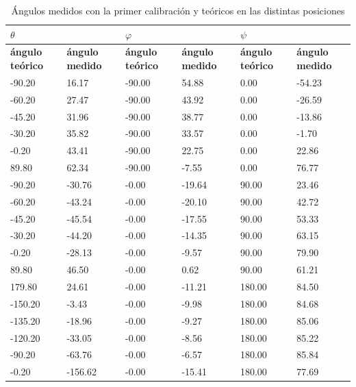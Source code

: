 \documentclass[main]{subfiles}
\begin{document}
\begin{table}
\begin{tabular}{|p{50pt}|p{50pt}|p{50pt}|p{51pt}|p{50pt}|p{50pt}|}
\hline
  
\multicolumn{2}{|p{113pt}|}{\cellcolor[gray]{0.6} $\theta$}  
& \multicolumn{2}{|p{114pt}|}{\cellcolor[gray]{0.6} $\varphi$}
& \multicolumn{2}{|p{113pt}|}{\cellcolor[gray]{0.6} $\psi$} 
\\ \hline 
   
 \multicolumn{1}{|p{50pt}|}{\cellcolor[gray]{0.7} \textbf{\'angulo te\'orico }} 
& \multicolumn{1}{|p{50pt}|}{\cellcolor[gray]{0.8} \textbf{ángulo medido}}
& \multicolumn{1}{|p{50pt}|}{\cellcolor[gray]{0.7} \textbf{\'angulo te\'orico }} 
& \multicolumn{1}{|p{50pt}|}{\cellcolor[gray]{0.8} \textbf{ángulo medido}}
& \multicolumn{1}{|p{50pt}|}{\cellcolor[gray]{0.7} \textbf{\'angulo te\'orico }} 
& \multicolumn{1}{|p{50pt}|}{\cellcolor[gray]{0.8} \textbf{ángulo medido}}
\\ \hline

 -90.20&  16.17&-90.00& 54.88&  0.00&-54.23\\ \hline
 -60.20&  27.47&-90.00& 43.92&  0.00&-26.59\\ \hline
 -45.20&  31.96&-90.00& 38.77&  0.00&-13.86\\ \hline
 -30.20&  35.82&-90.00& 33.57&  0.00& -1.70\\ \hline
  -0.20&  43.41&-90.00& 22.75&  0.00& 22.86\\ \hline
  89.80&  62.34&-90.00& -7.55&  0.00& 76.77\\ \hline
 -90.20& -30.76& -0.00&-19.64& 90.00& 23.46\\ \hline
 -60.20& -43.24& -0.00&-20.10& 90.00& 42.72\\ \hline
 -45.20& -45.54& -0.00&-17.55& 90.00& 53.33\\ \hline
 -30.20& -44.20& -0.00&-14.35& 90.00& 63.15\\ \hline
  -0.20& -28.13& -0.00& -9.57& 90.00& 79.90\\ \hline
  89.80&  46.50& -0.00&  0.62& 90.00& 61.21\\ \hline
 179.80&  24.61& -0.00&-11.21&180.00& 84.50\\ \hline
-150.20&  -3.43& -0.00& -9.98&180.00& 84.68\\ \hline
-135.20& -18.96& -0.00& -9.27&180.00& 85.06\\ \hline
-120.20& -33.05& -0.00& -8.56&180.00& 85.22\\ \hline
 -90.20& -63.76& -0.00& -6.57&180.00& 85.84\\ \hline
  -0.20&-156.62& -0.00&-15.41&180.00& 77.69\\ \hline
\end{tabular}
\caption{Ángulos medidos con la primer calibración y teóricos en las distintas posiciones}



\end{table}
\end{document}
